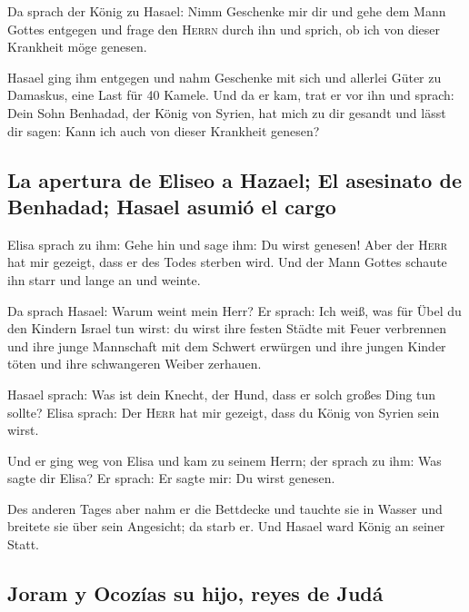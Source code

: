  Da sprach der König zu Hasael: Nimm Geschenke mir dir und
gehe dem Mann Gottes entgegen und frage den \textsc{Herrn} durch ihn und
sprich, ob ich von dieser Krankheit möge genesen.

 Hasael ging ihm entgegen und nahm Geschenke mit sich und
allerlei Güter zu Damaskus, eine Last für 40 Kamele. Und da er kam, trat
er vor ihn und sprach: Dein Sohn Benhadad, der König von Syrien, hat
mich zu dir gesandt und lässt dir sagen: Kann ich auch von dieser
Krankheit genesen?

\hypertarget{la-apertura-de-eliseo-a-hazael-el-asesinato-de-benhadad-hasael-asumiuxf3-el-cargo}{%
\subsection{La apertura de Eliseo a Hazael; El asesinato de Benhadad;
Hasael asumió el
cargo}\label{la-apertura-de-eliseo-a-hazael-el-asesinato-de-benhadad-hasael-asumiuxf3-el-cargo}}

 Elisa sprach zu ihm: Gehe hin und sage ihm: Du wirst
genesen! Aber der \textsc{Herr} hat mir gezeigt, dass er des Todes
sterben wird.  Und der Mann Gottes schaute ihn starr und
lange an und weinte.

 Da sprach Hasael: Warum weint mein Herr? Er sprach: Ich
weiß, was für Übel du den Kindern Israel tun wirst: du wirst ihre festen
Städte mit Feuer verbrennen und ihre junge Mannschaft mit dem Schwert
erwürgen und ihre jungen Kinder töten und ihre schwangeren Weiber
zerhauen.

 Hasael sprach: Was ist dein Knecht, der Hund, dass er
solch großes Ding tun sollte? Elisa sprach: Der \textsc{Herr} hat mir
gezeigt, dass du König von Syrien sein wirst.

 Und er ging weg von Elisa und kam zu seinem Herrn; der
sprach zu ihm: Was sagte dir Elisa? Er sprach: Er sagte mir: Du wirst
genesen.

 Des anderen Tages aber nahm er die Bettdecke und tauchte
sie in Wasser und breitete sie über sein Angesicht; da starb er. Und
Hasael ward König an seiner Statt.

\hypertarget{joram-y-ocozuxedas-su-hijo-reyes-de-juduxe1}{%
\subsection{Joram y Ocozías su hijo, reyes de
Judá}\label{joram-y-ocozuxedas-su-hijo-reyes-de-juduxe1}}

